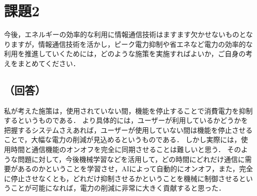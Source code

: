 \section*{課題2}
今後，エネルギーの効率的な利用に情報通信技術はますます欠かせないものとなりますが，情報通信技術を活かし，ピーク電力抑制や省エネなど電力の効率的な利用を推進していくためには，どのような施策を実施すればよいか，ご自身の考えをまとめてください． 

\subsection*{（回答）}
私が考えた施策は，使用されていない間，機能を停止することで消費電力を抑制するというものである．
より具体的には，ユーザーが利用しているかどうかを把握するシステムさえあれば，ユーザーが使用していない間は機能を停止させることで，大幅な電力の削減が見込めるというものである．
しかし実際には，使用時間と通信機能のオンオフを完全に同期させることは難しいと思う．
そのような問題に対して，今後機械学習などを活用して，どの時間にどれだけ通信に需要があるのかということを学習させ，AIによって自動的にオンオフ，また，完全に停止させなくとも，どれだけ抑制させるかということを機械に制御させるということが可能になれば，電力の削減に非常に大きく貢献すると思った．
